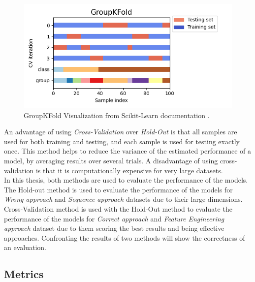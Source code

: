 \begin{itemize}
                    \begin{figure}[H]
                        \centering
                        \includegraphics[width=1.0\textwidth]{../src/resources/images/other/groupkfold.png}
                        \caption{
                          GroupKFold Visualization from Scikit-Learn documentation \cite{scikit-learn}.
                        }
                        \label{fig:groupkfold}
                    \end{figure}
                \end{itemize}
                
        An advantage of using \textit{Cross-Validation} over \textit{Hold-Out} is that all samples are used for both training and testing, and each sample is used for testing exactly once. This method helps to reduce the variance of the estimated performance of a model, by averaging results over several trials. A disadvantage of using cross-validation is that it is computationally expensive for very large datasets. \\ 

        In this thesis, both methods are used to evaluate the performance of the models. The Hold-out method is used to evaluate the performance of the models for \textit{Wrong approach} and \textit{Sequence approach} datasets due to their large dimensions. Cross-Validation method is used with the Hold-Out method to evaluate the performance of the models for \textit{Correct approach} and \textit{Feature Engineering approach} dataset due to them scoring the best results and being effective approaches. Confronting the results of two methods will show the correctness of an evaluation. \\
        
        \subsection{Metrics}

